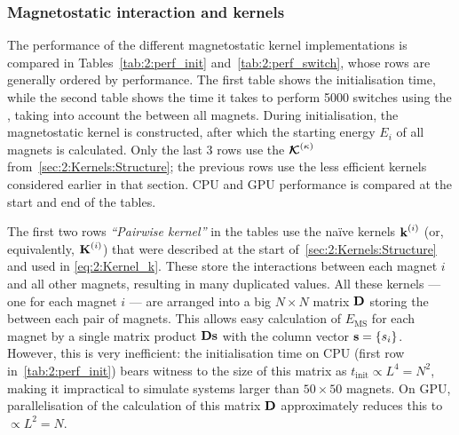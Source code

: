\subsubsection{Magnetostatic interaction and kernels}
The performance of the different magnetostatic kernel implementations is compared in Tables~\ref{tab:2:perf_init} and~\ref{tab:2:perf_switch}, whose rows are generally ordered by performance.
The first table shows the initialisation time, while the second table shows the time it takes to perform 5000 switches using the , taking into account the  between all magnets.
During initialisation, the magnetostatic kernel is constructed, after which the starting energy $E_i$ of all magnets is calculated.
Only the last 3 rows use the  $\boldsymbol{\mathbf{\mathcal{K}}}^{(\kappa)}$ from~\cref{sec:2:Kernels:Structure}; the previous rows use the less efficient kernels considered earlier in that section.
CPU and GPU performance is compared at the start and end of the tables. \par
The first two rows \textit{``Pairwise kernel''} in the tables use the na\"ive kernels $\boldsymbol{\mathbf{k}}^{(i)}$ (or, equivalently, $\boldsymbol{\mathbf{K}}^{(i)}$) that were described at the start of~\cref{sec:2:Kernels:Structure} and used in \cref{eq:2:Kernel_k}.
These store the interactions between each magnet $i$ and all other magnets, resulting in many duplicated values.
All these kernels --- one for each magnet $i$ --- are arranged into a big $N \times N$ matrix $\boldsymbol{\mathbf{D}}$ storing the  between each pair of magnets.
This allows easy calculation of $E_\mathrm{MS}$ for each magnet by a single matrix product $\boldsymbol{\mathbf{D}}\boldsymbol{\mathbf{s}}$ with the column vector $\boldsymbol{\mathbf{s}}=\{s_i\}$.
However, this is very inefficient: the initialisation time on CPU (first row in~\cref{tab:2:perf_init}) bears witness to the size of this matrix as $t_\mathrm{init} \propto L^4 = N^2$, making it impractical to simulate systems larger than $50 \times 50$ magnets.
On GPU, parallelisation of the calculation of this matrix $\boldsymbol{\mathbf{D}}$ approximately reduces this to $\propto L^2 = N$. \par

